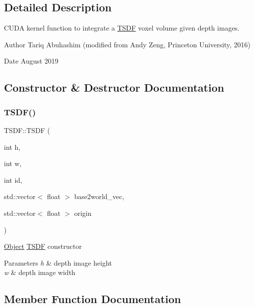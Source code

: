 \subsection{Detailed Description}
C\+U\+DA kernel function to integrate a \hyperlink{classTSDF}{T\+S\+DF} voxel volume given depth images. 

\begin{DoxyAuthor}{Author}
Tariq Abuhashim (modified from Andy Zeng, Princeton University, 2016) 
\end{DoxyAuthor}
\begin{DoxyDate}{Date}
August 2019 
\end{DoxyDate}


\subsection{Constructor \& Destructor Documentation}
\mbox{\label{classTSDF_ae5f83a336be140ee825d459990e54367}} 
\subsubsection{\texorpdfstring{T\+S\+D\+F()}{TSDF()}}
{\footnotesize\ttfamily T\+S\+D\+F\+::\+T\+S\+DF (\begin{DoxyParamCaption}\item[{int}]{h,  }\item[{int}]{w,  }\item[{int}]{id,  }\item[{std\+::vector$<$ float $>$}]{base2world\+\_\+vec,  }\item[{std\+::vector$<$ float $>$}]{origin }\end{DoxyParamCaption})}

\hyperlink{classObject}{Object} \hyperlink{classTSDF}{T\+S\+DF} constructor 
\begin{DoxyParams}{Parameters}
{\em h} & depth image height \\
\hline
{\em w} & depth image width \\
\hline
\end{DoxyParams}


\subsection{Member Function Documentation}
\mbox{\label{classTSDF_a6ab9e630dd5285603b8a8b0e7633fd88}} 
